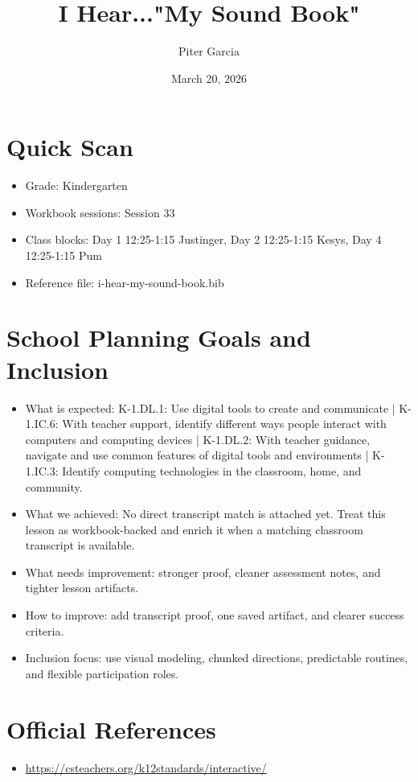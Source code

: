 \documentclass[11pt]{article}
\title{I Hear..."My Sound Book"}
\author{Piter Garcia}
\date{March 20, 2026}
\begin{document}
\maketitle
\section*{Quick Scan}
\begin{itemize}[leftmargin=*]
\item Grade: Kindergarten
\item Workbook sessions: Session 33
\item Class blocks: Day 1 12:25-1:15 Justinger, Day 2 12:25-1:15 Kesys, Day 4 12:25-1:15 Pum
\item Reference file: i-hear-my-sound-book.bib
\end{itemize}
\section*{School Planning Goals and Inclusion}
\begin{itemize}[leftmargin=*]
\item What is expected: K-1.DL.1: Use digital tools to create and communicate | K-1.IC.6: With teacher support, identify different ways people interact with computers and computing devices | K-1.DL.2: With teacher guidance, navigate and use common features of digital tools and environments | K-1.IC.3: Identify computing technologies in the classroom, home, and community.
\item What we achieved: No direct transcript match is attached yet. Treat this lesson as workbook-backed and enrich it when a matching classroom transcript is available.
\item What needs improvement: stronger proof, cleaner assessment notes, and tighter lesson artifacts.
\item How to improve: add transcript proof, one saved artifact, and clearer success criteria.
\item Inclusion focus: use visual modeling, chunked directions, predictable routines, and flexible participation roles.
\end{itemize}
\section*{Official References}
\begin{itemize}[leftmargin=*]
\item \url{https://csteachers.org/k12standards/interactive/}

\end{itemize}
\end{document}
